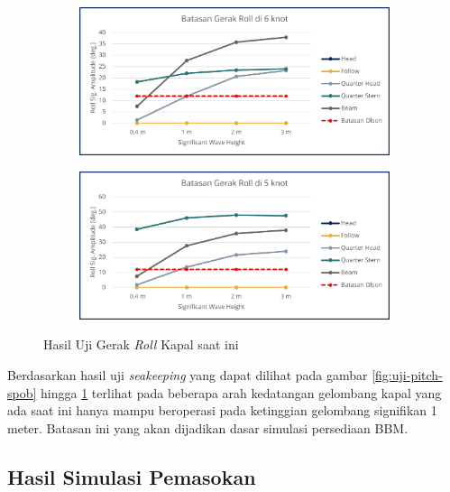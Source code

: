 \begin{figure}[!ht]
    \centering
    \begin{subfigure}{0.48\textwidth}
        \centering
        \includegraphics[width=\textwidth]{grafik/uji-roll-spob.jpg}
    \end{subfigure}
    \hfill  %
    \begin{subfigure}{0.48\textwidth}
        \centering
        \includegraphics[width=\textwidth]{grafik/uji-roll-spob2.jpg}
    \end{subfigure}
    \caption{Hasil Uji Gerak \emph{Roll} Kapal saat ini}
    \label{fig:uji-roll-spob}
\end{figure}

Berdasarkan hasil uji \emph{seakeeping} yang dapat dilihat pada gambar \ref{fig:uji-pitch-spob} hingga \ref{fig:uji-roll-spob} terlihat pada beberapa arah kedatangan gelombang kapal yang ada saat ini hanya mampu beroperasi pada ketinggian gelombang signifikan 1 meter. Batasan ini yang akan dijadikan dasar simulasi persediaan BBM.

\subsection{Hasil Simulasi Pemasokan}
\label{subsec:simul-existing}

